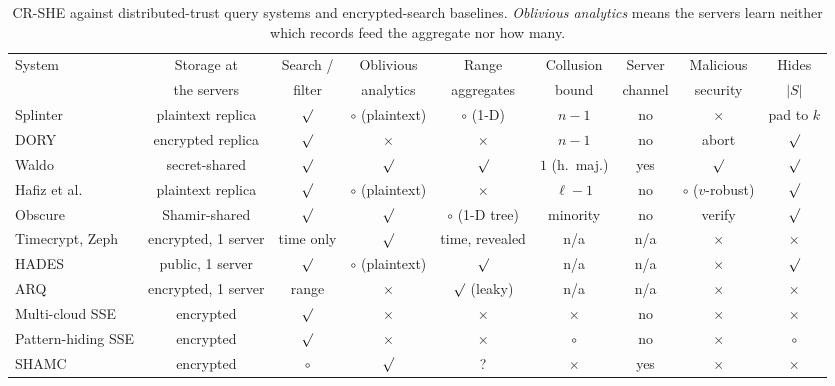 \documentclass[a4paper,fleqn]{cas-sc}
\providecommand{\checkmark}{\ensuremath{\surd}}
\begin{document}
\begin{table}[pos=t,width=\textwidth]
\caption{CR-SHE against distributed-trust query systems and encrypted-search
baselines. \emph{Oblivious analytics} means the servers learn neither which
records feed the aggregate nor how many.}
\label{tab:compare}
\centering
\scriptsize
\setlength{\tabcolsep}{3pt}
\begin{tabular*}{\tblwidth}{@{\extracolsep{\fill}}lcccccccc@{}}
\toprule
System & Storage at & Search / & Oblivious & Range & Collusion & Server &
Malicious & Hides \\
 & the servers & filter & analytics & aggregates & bound & channel & security &
$|S|$ \\
\midrule
Splinter \citep{splinter} & plaintext replica & $\checkmark$ &
$\circ$ (plaintext) & $\circ$ (1-D) & $n-1$ & no & $\times$ & pad to $k$ \\
DORY \citep{dory} & encrypted replica & $\checkmark$ & $\times$ & $\times$ &
$n-1$ & no & abort & $\checkmark$ \\
Waldo \citep{waldo} & secret-shared & $\checkmark$ & $\checkmark$ &
$\checkmark$ & $1$ (h.\ maj.) & yes & $\checkmark$ & $\checkmark$ \\
Hafiz et al.\ \citep{hafiz2024private} & plaintext replica & $\checkmark$ &
$\circ$ (plaintext) & $\times$ & $\ell-1$ & no & $\circ$ ($v$-robust) & $\checkmark$ \\
Obscure \citep{gupta2020obscure} & Shamir-shared & $\checkmark$ & $\checkmark$
& $\circ$ (1-D tree) & minority & no & verify & $\checkmark$ \\
Timecrypt, Zeph \citep{timecrypt,zeph} & encrypted, 1 server & time only &
$\checkmark$ & time, revealed & n/a & n/a & $\times$ & $\times$ \\
HADES \citep{liu2025hades} & public, 1 server & $\checkmark$ & $\circ$ (plaintext) &
$\checkmark$ & n/a & n/a & $\times$ & $\checkmark$ \\
ARQ \citep{espiritu2022arq} & encrypted, 1 server & range & $\times$ &
$\checkmark$ (leaky) & n/a & n/a & $\times$ & $\times$ \\
Multi-cloud SSE \citep{xu2021privacy} & encrypted & $\checkmark$ & $\times$ &
$\times$ & $\times$ & no & $\times$ & $\times$ \\
Pattern-hiding SSE \citep{xu2023symmetric} & encrypted & $\checkmark$ &
$\times$ & $\times$ & $\circ$ & no & $\times$ & $\circ$ \\
SHAMC \citep{wang2020shamc} & encrypted & $\circ$ & $\checkmark$ & ? &
$\times$ & yes & $\times$ & $\times$ \\

\end{tabular*}
\end{table}
\end{document}

